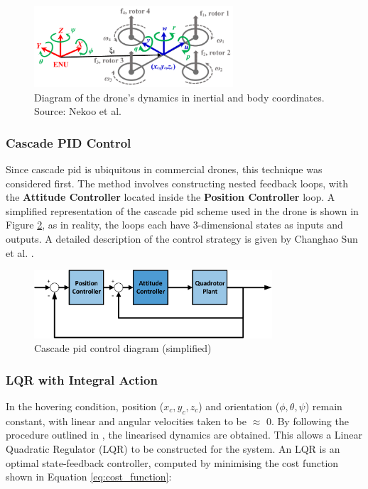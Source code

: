 \begin{figure}[H]
\centering
\includegraphics[width=0.66\textwidth]{figs/Samuel/Figures/nekoo1-0005-large.png}
\caption[Diagram of the drone's dynamics in inertial and body coordinates]{Diagram of the drone's dynamics in inertial and body coordinates. Source: Nekoo et al. \cite{nekoo}}
\label{fig:nekoodiag}
\end{figure}

\subsubsection{Cascade PID Control}
Since cascade \gls{pid} is ubiquitous in commercial drones, this technique was considered first. The method involves constructing nested feedback loops, with the \textbf{Attitude Controller} located inside the \textbf{Position Controller} loop. A simplified representation of the cascade \gls{pid} scheme used in the drone is shown in Figure \ref{fig:pidloop}, as in reality, the loops each have 3-dimensional states as inputs and outputs. A detailed description of the control strategy is given by Changhao Sun et al. \cite{electronics10040376}.

\begin{figure}[H]
\centering
\includegraphics[width=0.79\textwidth]{figs/Samuel/Figures/Control Loop-cropped.pdf}
\caption{Cascade \gls{pid} control diagram (simplified)}
\label{fig:pidloop}
\end{figure}




\subsubsection{LQR with Integral Action}
\label{sec:symbs}

In the hovering condition, position (\(x_c, y_c, z_c\)) and orientation (\(\phi, \theta, \psi\)) remain constant, with linear and angular velocities taken to be $\approx$ 0. By following the procedure outlined in \cite{cengiz2024quadcopter}, the linearised dynamics are obtained. This allows a Linear Quadratic Regulator (LQR) to be constructed for the system. An LQR is an optimal state-feedback controller, computed by minimising the cost function shown in Equation \ref{eq:cost_function}:


